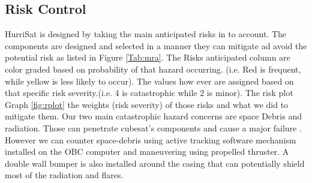 \subsection{Risk Control}
HurriSat is designed by taking the main anticipated risks in to account. The components are designed and selected in a manner they can mitigate ad avoid the potential risk as listed in Figure \ref{Tab:mra}. The Risks anticipated column are color graded based on probability of that hazard occurring. (i.e. Red is frequent, while yellow is less likely to occur). The values how ever are assigned based on that specific risk severity.(i.e. 4 is catastrophic while 2 is minor). The risk plot Graph \ref{fig:rplot} the weights (risk severity) of those risks and what we did to mitigate them. Our two main catastrophic hazard concerns are space Debris and radiation. Those can penetrate cubesat's components and cause a major failure . However we can counter space-debris using active tracking software mechanism installed on the OBC computer and maneuvering using propelled thruster. A double wall bumper is also installed around the casing that can potentially shield most of the radiation and flares.

